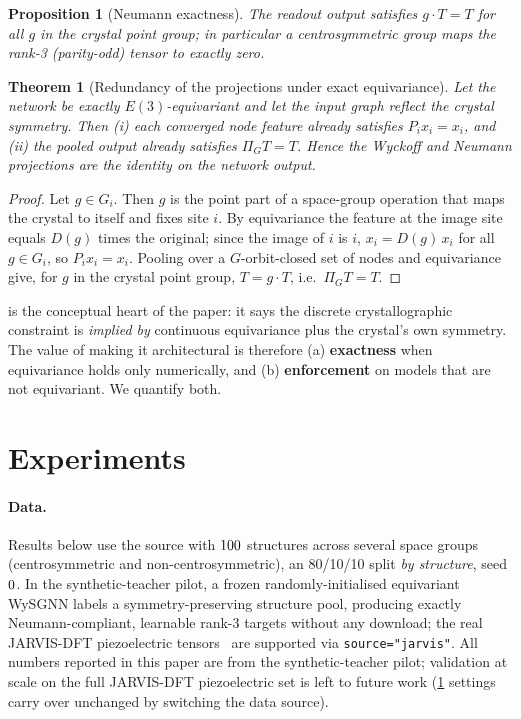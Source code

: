 \documentclass[11pt]{article}
\newtheorem{theorem}{Theorem}
\newtheorem{proposition}{Proposition}
\begin{document}
\begin{proposition}[Neumann exactness]\label{prop:neumann}
The readout output satisfies $g\cdot T=T$ for all $g$ in the crystal point group;
in particular a centrosymmetric group maps the rank-3 (parity-odd) tensor to
exactly zero.
\end{proposition}

\begin{theorem}[Redundancy of the projections under exact equivariance]\label{thm:noop}
Let the network be exactly $E(3)$-equivariant and let the input graph reflect the
crystal symmetry. Then (i) each converged node feature already satisfies
$P_i x_i = x_i$, and (ii) the pooled output already satisfies $\Pi_G T = T$.
Hence the Wyckoff and Neumann projections are the identity on the network output.
\end{theorem}
\begin{proof}
Let $g\in G_i$. Then $g$ is the point part of a space-group operation that maps
the crystal to itself and fixes site $i$. By equivariance the feature at the
image site equals $D(g)$ times the original; since the image of $i$ is $i$,
$x_i = D(g)\,x_i$ for all $g\in G_i$, so $P_i x_i=x_i$. Pooling over a
$G$-orbit-closed set of nodes and equivariance give, for $g$ in the crystal point
group, $T = g\cdot T$, i.e.\ $\Pi_G T = T$.
\end{proof}

 is the conceptual heart of the paper: it says the discrete
crystallographic constraint is \emph{implied by} continuous equivariance plus the
crystal's own symmetry. The value of making it architectural is therefore (a)
\textbf{exactness} when equivariance holds only numerically, and (b)
\textbf{enforcement} on models that are not equivariant. We quantify both.

\section{Experiments}\label{sec:exp}
\paragraph{Data.}
Results below use the \texttt{\datasetSource} source with $100$ structures
across several space groups (centrosymmetric and non-centrosymmetric), an
80/10/10 split \emph{by structure}, seed $0$. In the synthetic-teacher
pilot, a frozen randomly-initialised equivariant WySGNN labels a
symmetry-preserving structure pool, producing exactly Neumann-compliant,
learnable rank-3 targets without any download; the real JARVIS-DFT
piezoelectric tensors~\cite{jarvis2020} are supported via
\texttt{source="jarvis"}. All numbers reported in this paper are from the
synthetic-teacher pilot; validation at scale on the full JARVIS-DFT
piezoelectric set is left to future work (\cref{sec:exp} settings carry over
unchanged by switching the data source).
\end{document}
